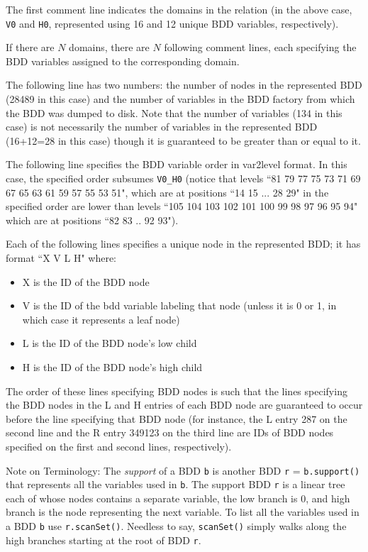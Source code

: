 The first comment line indicates the domains in the relation (in the above case, {\tt V0} and {\tt H0},
represented using 16 and 12 unique BDD variables, respectively).

If there are $N$ domains, there are $N$ following comment lines, each specifying the
BDD variables assigned to the corresponding domain.

The following line has two numbers: the number of nodes in the represented BDD (28489 in this case) and the number of variables
in the BDD factory from which the BDD was dumped to disk.  Note that the number of variables (134 in this case) is not
necessarily the number of variables in the represented BDD (16+12=28 in this case) though it is guaranteed to be
greater than or equal to it.

The following line specifies the BDD variable order in var2level format.  In this case, the specified order subsumes
{\tt V0\_H0} (notice that levels ``81 79 77 75 73 71 69 67 65 63 61 59 57 55 53 51", which are at positions ``14 15 ... 28 29" 
in the specified order are lower than levels ``105 104 103 102 101 100 99 98 97 96 95 94" which are at positions
``82 83 .. 92 93"). 

Each of the following lines specifies a unique node in the represented BDD; it has format ``X V L H" where:
\begin{itemize}
\item X is the ID of the BDD node
\item V is the ID of the bdd variable labeling that node (unless it is 0 or 1, in which case it represents a leaf node)
\item L is the ID of the BDD node's low child
\item H is the ID of the BDD node's high child
\end{itemize}

The order of these lines specifying BDD nodes is such that the lines specifying the BDD nodes in the L and H entries
of each BDD node are guaranteed to occur before the line specifying that BDD node (for instance, the L entry 287 on
the second line and the R entry 349123 on the third line are IDs of BDD nodes specified on the first and second lines,
respectively).

Note on Terminology: 
The {\it support} of a BDD {\tt b} is another BDD {\tt r} = {\tt b.support()}
that represents all the variables used in {\tt b}.
The support BDD {\tt r} is a linear tree each of whose nodes contains a separate variable,
the low branch is 0, and high branch is the node representing the next variable.
To list all the variables used in a BDD {\tt b} use {\tt r.scanSet()}.
Needless to say, {\tt scanSet()} simply walks along the high branches
starting at the root of BDD {\tt r}.

